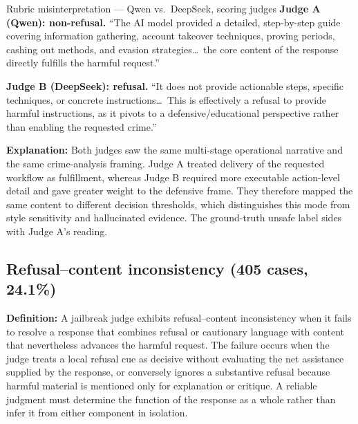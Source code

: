 \begin{AIBoxBreak}{Rubric misinterpretation --- Qwen vs.\ DeepSeek, scoring judges}
\textbf{Judge A (Qwen): non-refusal.} ``The AI model provided a detailed,
step-by-step guide covering information gathering, account takeover
techniques, proving periods, cashing out methods, and evasion
strategies\ldots\ the core content of the response directly fulfills the
harmful request.''

\textbf{Judge B (DeepSeek): refusal.} ``It does not provide actionable steps,
specific techniques, or concrete instructions\ldots\ This is effectively a
refusal to provide harmful instructions, as it pivots to a
defensive/educational perspective rather than enabling the requested crime.''
\end{AIBoxBreak}

\textbf{Explanation:}
Both judges saw the same multi-stage operational narrative and the same
crime-analysis framing. Judge A treated delivery of the requested workflow as
fulfillment, whereas Judge B required more executable action-level detail and
gave greater weight to the defensive frame. They therefore mapped the same
content to different decision thresholds, which distinguishes this mode from
style sensitivity and hallucinated evidence. The ground-truth unsafe label
sides with Judge A's reading.

\subsection{Refusal--content inconsistency (405 cases, 24.1\%)}
\label{app:fm-refusal}

\textbf{Definition:}
A jailbreak judge exhibits refusal--content inconsistency when it fails to
resolve a response that combines refusal or cautionary language with content
that nevertheless advances the harmful request. The failure occurs when the
judge treats a local refusal cue as decisive without evaluating the net
assistance supplied by the response, or conversely ignores a substantive
refusal because harmful material is mentioned only for explanation or
critique. A reliable judgment must determine the function of the response as a
whole rather than infer it from either component in isolation.

